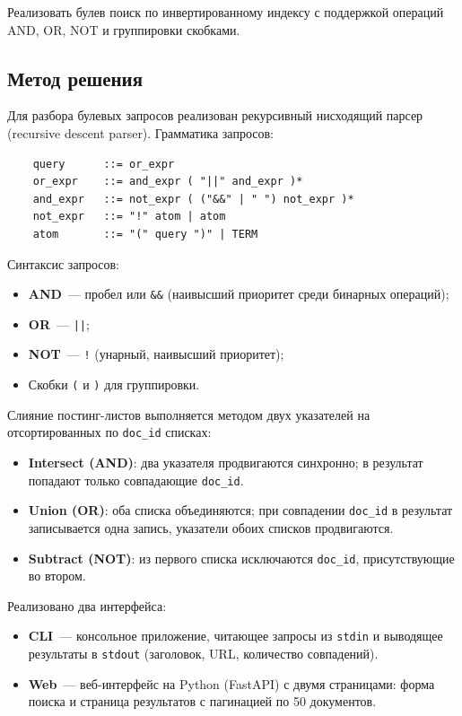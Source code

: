 \documentclass[a4paper,12pt]{article}
\begin{document}
Реализовать булев поиск по инвертированному индексу с поддержкой операций AND, OR, NOT и группировки скобками.

\subsection{Метод решения}

Для разбора булевых запросов реализован рекурсивный нисходящий парсер (recursive descent parser). Грамматика запросов:

\begin{verbatim}
    query      ::= or_expr
    or_expr    ::= and_expr ( "||" and_expr )*
    and_expr   ::= not_expr ( ("&&" | " ") not_expr )*
    not_expr   ::= "!" atom | atom
    atom       ::= "(" query ")" | TERM
\end{verbatim}

Синтаксис запросов:
\begin{itemize}
    \item \textbf{AND}~--- пробел или \texttt{\&\&} (наивысший приоритет среди бинарных операций);
    \item \textbf{OR}~--- \texttt{||};
    \item \textbf{NOT}~--- \texttt{!} (унарный, наивысший приоритет);
    \item Скобки \texttt{(} и \texttt{)} для группировки.
\end{itemize}

Слияние постинг-листов выполняется методом двух указателей на отсортированных по \texttt{doc\_id} списках:
\begin{itemize}
    \item \textbf{Intersect (AND)}: два указателя продвигаются синхронно; в результат попадают только совпадающие \texttt{doc\_id}.
    \item \textbf{Union (OR)}: оба списка объединяются; при совпадении \texttt{doc\_id} в результат записывается одна запись, указатели обоих списков продвигаются.
    \item \textbf{Subtract (NOT)}: из первого списка исключаются \texttt{doc\_id}, присутствующие во втором.
\end{itemize}

Реализовано два интерфейса:
\begin{itemize}
    \item \textbf{CLI}~--- консольное приложение, читающее запросы из \texttt{stdin} и выводящее результаты в \texttt{stdout} (заголовок, URL, количество совпадений).
    \item \textbf{Web}~--- веб-интерфейс на Python (FastAPI) с двумя страницами: форма поиска и страница результатов с пагинацией по 50 документов.
\end{itemize}
\end{document}
